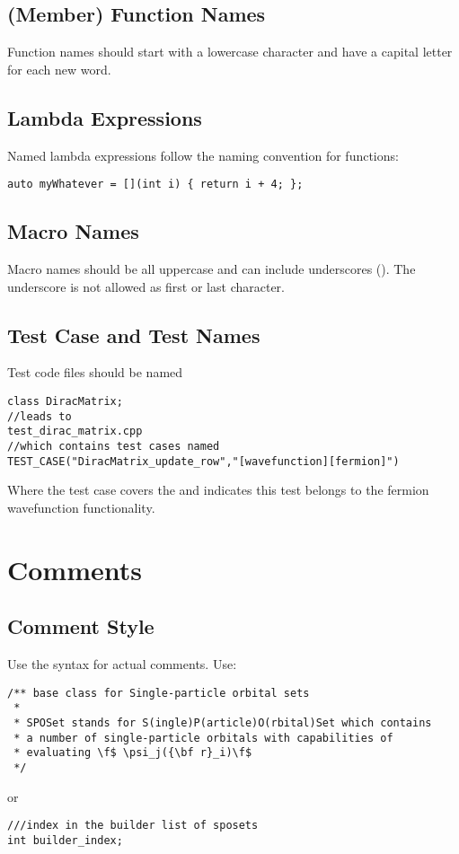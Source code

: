 \subsection{(Member) Function Names}
Function names should start with a lowercase character and have a capital letter for each new word.

\subsection{Lambda Expressions}
Named lambda expressions follow the naming convention for functions:

\begin{lstlisting}[showspaces=false]
auto myWhatever = [](int i) { return i + 4; };
\end{lstlisting}

\subsection{Macro Names}
Macro names should be all uppercase and can include underscores (\inlinecode{_}).
The underscore is not allowed as first or last character.

\subsection{Test Case and Test Names}
Test code files should be named
\begin{lstlisting}[showspaces=false]
class DiracMatrix;
//leads to
test_dirac_matrix.cpp
//which contains test cases named
TEST_CASE("DiracMatrix_update_row","[wavefunction][fermion]")
\end{lstlisting}
Where the test case covers the  and  \inlinecode{[wavefunction][fermion]} indicates this test belongs to the fermion wavefunction functionality.

\section{Comments}
\subsection{Comment Style}
Use the  syntax for actual comments.
Use:
\begin{lstlisting}
/** base class for Single-particle orbital sets
 *
 * SPOSet stands for S(ingle)P(article)O(rbital)Set which contains
 * a number of single-particle orbitals with capabilities of
 * evaluating \f$ \psi_j({\bf r}_i)\f$
 */
\end{lstlisting}
or
\begin{lstlisting}
///index in the builder list of sposets
int builder_index;
\end{lstlisting}

